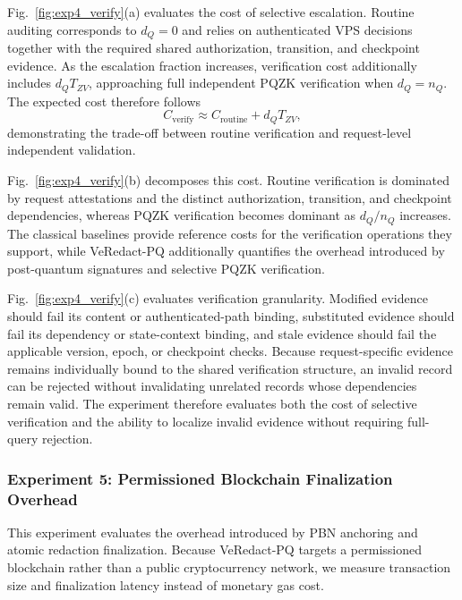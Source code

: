 \documentclass[lettersize,journal]{IEEEtran}
\begin{document}
Fig.~\ref{fig:exp4_verify}(a) evaluates the cost of selective
escalation. Routine auditing corresponds to $d_Q=0$ and relies on
authenticated VPS decisions together with the required shared
authorization, transition, and checkpoint evidence. As the escalation
fraction increases, verification cost additionally includes
$d_QT_{ZV}$, approaching full independent PQZK verification when
$d_Q=n_Q$. The expected cost therefore follows
\begin{equation}
C_{\mathrm{verify}}
\approx
C_{\mathrm{routine}}+d_QT_{ZV},
\end{equation}
demonstrating the trade-off between routine verification and
request-level independent validation.

Fig.~\ref{fig:exp4_verify}(b) decomposes this cost. Routine verification
is dominated by request attestations and the distinct authorization,
transition, and checkpoint dependencies, whereas PQZK verification
becomes dominant as $d_Q/n_Q$ increases. The classical baselines provide
reference costs for the verification operations they support, while
VeRedact-PQ additionally quantifies the overhead introduced by
post-quantum signatures and selective PQZK verification.

Fig.~\ref{fig:exp4_verify}(c) evaluates verification granularity.
Modified evidence should fail its content or authenticated-path
binding, substituted evidence should fail its dependency or
state-context binding, and stale evidence should fail the applicable
version, epoch, or checkpoint checks. Because request-specific evidence
remains individually bound to the shared verification structure, an
invalid record can be rejected without invalidating unrelated records
whose dependencies remain valid. The experiment therefore evaluates
both the cost of selective verification and the ability to localize
invalid evidence without requiring full-query rejection.
    
 \subsubsection*{\textbf{Experiment 5: Permissioned Blockchain Finalization Overhead}}

This experiment evaluates the overhead introduced by PBN anchoring and
atomic redaction finalization. Because VeRedact-PQ targets a permissioned
blockchain rather than a public cryptocurrency network, we measure
transaction size and finalization latency instead of monetary gas cost.
\end{document}
